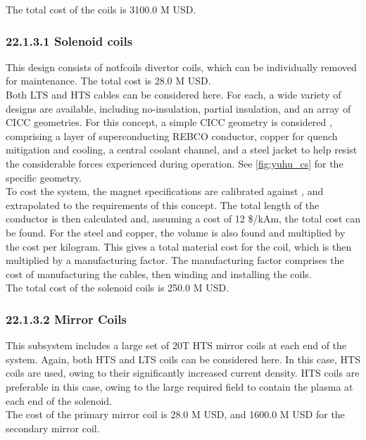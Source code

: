 The total cost of the coils is 3100.0 M USD.


\subsubsection*{22.1.3.1 Solenoid coils}

This design consists of notfcoils divertor coils, which can be individually removed for maintenance. The total cost is 28.0 M USD.\\

Both LTS and HTS cables can be considered here. For each, a wide variety of designs are available, including no-insulation, partial insulation, and an array of CICC geometries. For this concept, a simple CICC geometry is considered \cite{Menard2016}, comprising a layer of superconducting REBCO conductor, copper for quench mitigation and cooling, a central coolant channel, and a steel jacket to help resist the considerable forces experienced during operation. See \ref{fig:yuhu_cs} for the specific geometry.\\

To cost the system, the magnet specifications are calibrated against \cite{Menard2016}, and extrapolated to the requirements of this concept. The total length of the conductor is then calculated and, assuming a cost of 12 \$/kAm, the total cost can be found. For the steel and copper, the volume is also found and multiplied by the cost per kilogram. This gives a total material cost for the coil, which is then multiplied by a manufacturing factor. The manufacturing factor comprises the cost of manufacturing the cables, then winding and installing the coils. \\

The total cost of the solenoid coils is 250.0 M USD.


\subsubsection*{22.1.3.2 Mirror Coils}

This subsystem includes a large set of 20T HTS mirror coils at each end of the system. Again, both HTS and LTS coils can be considered here. In this case, HTS coils are used, owing to their significantly increased current density. HTS coils are preferable in this case, owing to the large required field to contain the plasma at each end of the solenoid.  \\

The cost of the primary mirror coil is 28.0 M USD, and 1600.0 M USD for the secondary mirror coil. \\


